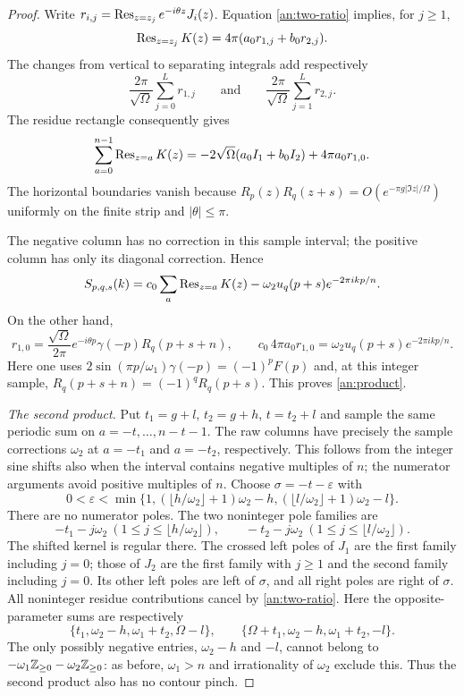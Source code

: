 \begin{proof}
Write $r_{i,j}=\operatorname{Res}_{z=z_j}e^{-i\theta z}J_i(z)$.
Equation \eqref{an:two-ratio} implies, for $j\ge1$,
\[
 \operatorname{Res}_{z=z_j}K(z)=4\pi(a_0r_{1,j}+b_0r_{2,j}).
\]
The changes from vertical to separating integrals add respectively
\[
 \frac{2\pi}{\sqrt\Omega}\sum_{j=0}^Lr_{1,j}
 \qquad\text{and}\qquad
 \frac{2\pi}{\sqrt\Omega}\sum_{j=1}^Lr_{2,j}.
\]
The residue rectangle consequently gives
\begin{equation}
 \sum_{a=0}^{n-1}\operatorname{Res}_{z=a}K(z)
 =-2\sqrt\Omega(a_0I_1+b_0I_2)+4\pi a_0r_{1,0}.
 \label{an:rectangle}
\end{equation}
The horizontal boundaries vanish because
$R_p(z)R_q(z+s)=O(e^{-\pi g|\Im z|/\Omega})$ uniformly on the
finite strip and $|\theta|\le\pi$.

The negative column has no correction in this sample interval; the
positive column has only its diagonal correction.  Hence
\[
 S_{p,q,s}(k)=c_0\sum_a\operatorname{Res}_{z=a}K(z)
                    -\omega_2 u_q(p+s)e^{-2\pi ikp/n}.
\]
On the other hand,
\[
 r_{1,0}=\frac{\sqrt\Omega}{2\pi}e^{-i\theta p}
                 \gamma(-p)R_q(p+s+n),\qquad
 c_0\,4\pi a_0r_{1,0}=\omega_2 u_q(p+s)e^{-2\pi ikp/n}.
\]
Here one uses $2\sin(\pi p/\omega_1)\gamma(-p)=(-1)^pF(p)$ and,
at this integer sample, $R_q(p+s+n)=(-1)^qR_q(p+s)$.
This proves \eqref{an:product}.

\emph{The second product.}
Put $t_1=g+l$, $t_2=g+h$, $t=t_2+l$ and
sample the same periodic sum on $a=-t,\ldots,n-t-1$.
The raw columns have precisely the sample corrections $\omega_2$ at $a=-t_1$ and
$a=-t_2$, respectively.  This follows from the integer sine shifts
also when the interval contains negative multiples of $n$;
the numerator arguments avoid positive multiples of $n$.
Choose $\sigma=-t-\varepsilon$ with
\[
 0<\varepsilon<\min\{1,(\lfloor h/\omega_2\rfloor+1)\omega_2-h,
                         (\lfloor l/\omega_2\rfloor+1)\omega_2-l\}.
\]
There are no numerator poles.  The two noninteger pole families are
\[
 -t_1-j\omega_2\ (1\le j\le\lfloor h/\omega_2\rfloor),\qquad
 -t_2-j\omega_2\ (1\le j\le\lfloor l/\omega_2\rfloor).
\]
The shifted kernel is regular there.  The crossed left poles of
$J_1$ are the first family including $j=0$; those of $J_2$ are
the first family with $j\ge1$ and the second family including
$j=0$.  Its other left poles are left of $\sigma$, and all right
poles are right of $\sigma$.  All noninteger residue contributions
cancel by \eqref{an:two-ratio}.
Here the opposite-parameter sums are respectively
\[
 \{t_1,\omega_2-h,\omega_1+t_2,\Omega-l\},\qquad
 \{\Omega+t_1,\omega_2-h,\omega_1+t_2,-l\}.
\]
The only possibly negative entries, $\omega_2-h$ and $-l$, cannot
belong to $-\omega_1\mathbb Z_{\ge0}-\omega_2\mathbb Z_{\ge0}$: as before,
$\omega_1>n$ and irrationality of $\omega_2$ exclude this.  Thus the
second product also has no contour pinch.


\end{proof}
